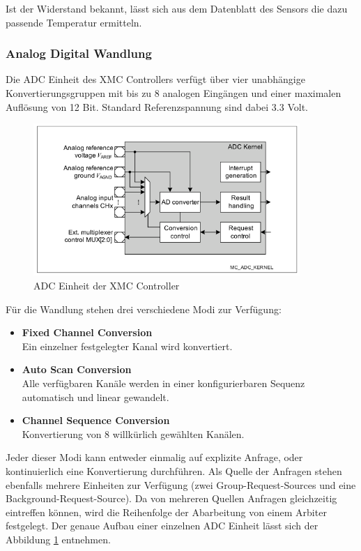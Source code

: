 Ist der Widerstand bekannt, lässt sich aus dem Datenblatt des Sensors die dazu passende Temperatur ermitteln.

\subsubsection{Analog Digital Wandlung}
Die ADC Einheit des XMC Controllers verfügt über vier unabhängige Konvertierungsgruppen mit bis zu 8 analogen Eingängen und einer maximalen Auflösung von 12 Bit. Standard Referenzspannung sind dabei 3.3 Volt.

\begin{figure}[ht]
\centering
\includegraphics[width=0.9\textwidth]{sensor/xmc_adc.PNG}
\caption{ADC Einheit der XMC Controller}
\label{img:xmc_adc}
\end{figure}

Für die Wandlung stehen drei verschiedene Modi zur Verfügung: 
\begin{itemize}
\item \textbf{Fixed Channel Conversion} \\
Ein einzelner festgelegter Kanal wird konvertiert.
\item \textbf{Auto Scan Conversion} \\
Alle verfügbaren Kanäle werden in einer konfigurierbaren Sequenz automatisch und linear gewandelt.
\item \textbf{Channel Sequence Conversion} \\
Konvertierung von 8 willkürlich gewählten Kanälen.
\end{itemize}
Jeder dieser Modi kann entweder einmalig auf explizite Anfrage, oder kontinuierlich eine Konvertierung durchführen. Als Quelle der Anfragen stehen ebenfalls mehrere Einheiten zur Verfügung (zwei Group-Request-Sources und eine Background-Request-Source). Da von mehreren Quellen Anfragen gleichzeitig eintreffen können, wird die Reihenfolge der Abarbeitung von einem Arbiter festgelegt. Der genaue Aufbau einer einzelnen ADC Einheit lässt sich der Abbildung \ref{img:xmc_adc} entnehmen. \\

